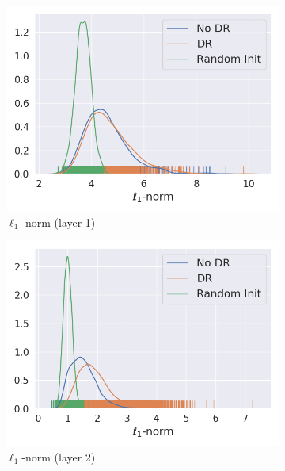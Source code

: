 \begin{figure}
  \centering
  \begin{subfigure}{0.24\textwidth}
    \includegraphics[width=\textwidth]{figures/chapter6/weightdistributions/conv1_l1}
    \caption{$\ell_1$-norm (layer 1)}
  \end{subfigure}
  \begin{subfigure}{0.24\textwidth}
    \includegraphics[width=\textwidth]{figures/chapter6/weightdistributions/conv2_l1}
    \caption{$\ell_1$-norm (layer 2)}
  \end{subfigure}
  \begin{subfigure}{0.24\textwidth}

\end{subfigure}
\end{figure}
